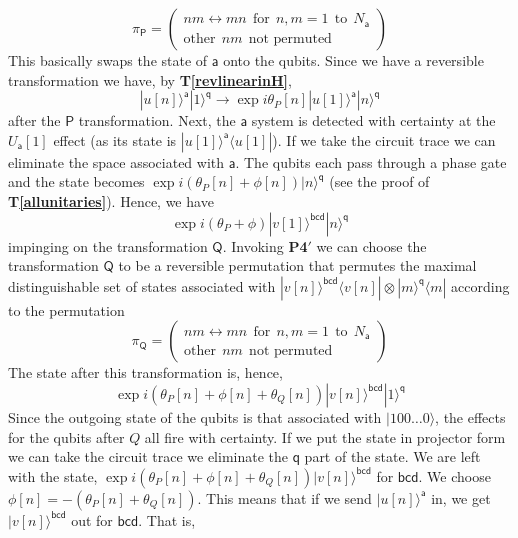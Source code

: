 \documentclass[10pt]{article}
\begin{document}
\begin{equation}
\pi_\mathsf{P} = \left( \begin{array}{l} nm \leftrightarrow mn  ~~\text{for}~~ n,m=1~~\text{to}~~ N_\mathsf{a} \\
                           \text{other}~~ nm ~~ \text{not permuted}  \end{array} \right)
\end{equation}
This basically swaps the state of $\mathsf a$ onto the qubits.  Since we have a reversible transformation we have, by {\bf T\ref{revlinearinH}},
\begin{equation}
|u[n]\rangle^\mathsf{a} |1\rangle^\mathsf{q} \rightarrow  \exp{i\theta_P[n]} |u[1]\rangle^\mathsf{a} |n\rangle^\mathsf{q}
\end{equation}
after the $\mathsf P$ transformation.  Next, the $\mathsf a$ system is detected with certainty at the $U_\mathsf{a}[1]$ effect (as its state is $|u[1]\rangle^\mathsf{a}\langle u[1]|$).  If we take the circuit trace we can eliminate the space associated with $\mathsf a$.  The qubits each pass through a phase gate and the state becomes $\exp i(\theta_P[n]+\phi[n]) |n\rangle^\mathsf{q}$ (see the proof of {\bf T\ref{allunitaries}}).  Hence, we have
\begin{equation}
\exp i(\theta_P+\phi) |v[1]\rangle^\mathsf{bcd} |n\rangle^\mathsf{q}
\end{equation}
impinging on the transformation $\mathsf Q$.   Invoking {\bf P4}$'$ we can choose the transformation $\mathsf Q$ to be a reversible permutation that permutes the maximal distinguishable set of states associated with
$|v[n]\rangle^\mathsf{bcd}\langle v[n]|\otimes |m\rangle^\mathsf{q}\langle m|$ according to the permutation
\begin{equation}
\pi_\mathsf{Q} = \left( \begin{array}{l} nm \leftrightarrow mn  ~~\text{for}~~ n, m=1~~\text{to}~~ N_\mathsf{a} \\
                           \text{other}~~ nm ~~ \text{not permuted}  \end{array} \right)
\end{equation}
The state after this transformation is, hence,
\begin{equation}
\exp i(\theta_P[n]+\phi[n]+\theta_Q[n]) |v[n]\rangle^\mathsf{bcd} |1\rangle^\mathsf{q}
\end{equation}
Since the outgoing state of the qubits is that associated with $|100\dots 0\rangle$, the effects for the qubits after $Q$ all fire with certainty. If we put the state in projector form we can take the circuit trace we eliminate the $\mathsf{q}$ part of the state.   We are left with the state, $\exp i(\theta_P[n]+\phi[n]+\theta_Q[n]) |v[n]\rangle^\mathsf{bcd}$ for $\mathsf{bcd}$.  We choose $\phi[n]=-(\theta_P[n]+\theta_Q[n])$.  This means that if we send $|u[n]\rangle^\mathsf{a}$ in, we get $|v[n]\rangle^\mathsf{bcd}$ out for $\mathsf{bcd}$.  That is,
\end{document}
